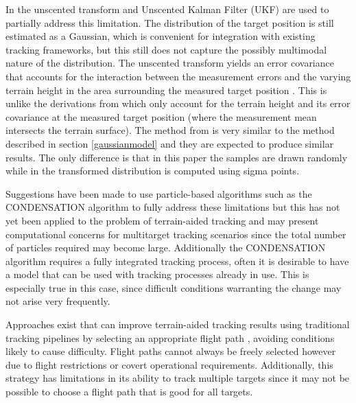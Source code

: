 \documentclass[journal]{IEEEtran}
\begin{document}
In \cite{kim2009terrain} the unscented transform and Unscented Kalman Filter (UKF) are used to partially address this limitation. The distribution of the target position is still estimated as a Gaussian, which is convenient for integration with existing tracking frameworks, but this still does not capture the possibly multimodal nature of the distribution. The unscented transform yields an error covariance that accounts for the interaction between the measurement errors and the varying terrain height in the area surrounding the measured target position \cite{kim2009terrain}. This is unlike the derivations from \cite{mallick2007geolocation} which only account for the terrain height and its error covariance at the measured target position (where the measurement mean intersects the terrain surface). The method from \cite{kim2009terrain} is very similar to the method described in section \ref{gaussianmodel} and they are expected to produce similar results. The only difference is that in this paper the samples are drawn randomly while in \cite{kim2009terrain} the transformed distribution is computed using sigma points.

Suggestions have been made \cite{collins1998using, davison1999mobile} to use particle-based algorithms such as the CONDENSATION algorithm \cite{isard1996contour} to fully address these limitations but this has not yet been applied to the problem of terrain-aided tracking and may present computational concerns for multitarget tracking scenarios since the total number of particles required may become large. Additionally the CONDENSATION algorithm requires a fully integrated tracking process, often it is desirable to have a model that can be used with tracking processes already in use. This is especially true in this case, since difficult conditions warranting the change may not arise very frequently.

Approaches exist that can improve terrain-aided tracking results using traditional tracking pipelines by selecting an appropriate flight path \cite{barber2006vision}, avoiding conditions likely to cause difficulty. Flight paths cannot always be freely selected however due to flight restrictions or covert operational requirements. Additionally, this strategy has limitations in its ability to track multiple targets since it may not be possible to choose a flight path that is good for all targets.
\end{document}
